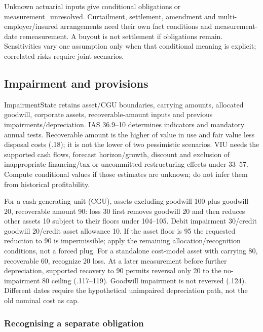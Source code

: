 Unknown actuarial inputs give conditional obligations or measurement\_unresolved. Curtailment, settlement, amendment and multi-employer/insured arrangements need their own fact conditions and measurement-date remeasurement. A buyout is not settlement if obligations remain. Sensitivities vary one assumption only when that conditional meaning is explicit; correlated risks require joint scenarios.

\hypertarget{impairment-and-provisions}{%
\subsection{Impairment and provisions}\label{method-corporate-extensions-impairment-and-provisions}}

ImpairmentState retains asset/CGU boundaries, carrying amounts, allocated goodwill, corporate assets, recoverable-amount inputs and previous impairments/depreciation. IAS 36.9--10 determines indicators and mandatory annual tests. Recoverable amount is the higher of value in use and fair value less disposal costs (.18); it is not the lower of two pessimistic scenarios. VIU needs the supported cash flows, forecast horizon/growth, discount and exclusion of inappropriate financing/tax or uncommitted restructuring effects under 33--57. Compute conditional values if those estimates are unknown; do not infer them from historical profitability.

For a cash-generating unit (CGU), assets excluding goodwill 100 plus goodwill 20, recoverable amount 90: loss 30 first removes goodwill 20 and then reduces other assets 10 subject to their floors under 104--105. Debit impairment 30/credit goodwill 20/credit asset allowance 10. If the asset floor is 95 the requested reduction to 90 is impermissible; apply the remaining allocation/recognition conditions, not a forced plug. For a standalone cost-model asset with carrying 80, recoverable 60, recognize 20 loss. At a later measurement before further depreciation, supported recovery to 90 permits reversal only 20 to the no-impairment 80 ceiling (.117--119). Goodwill impairment is not reversed (.124). Different dates require the hypothetical unimpaired depreciation path, not the old nominal cost as cap.



\subsubsection{Recognising a separate obligation}

